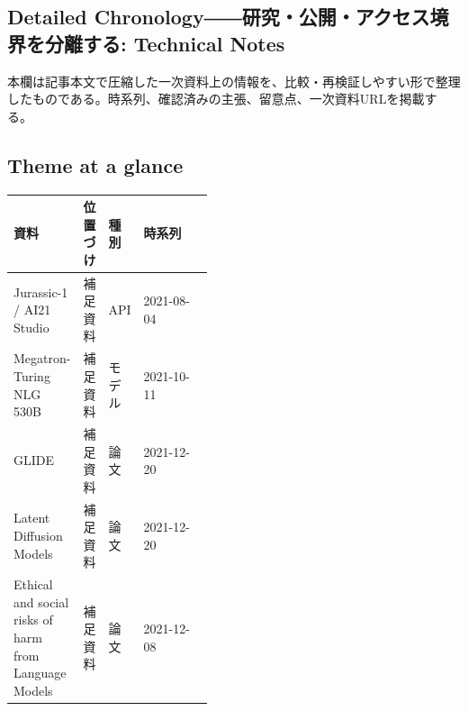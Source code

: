 \subsection*{Detailed Chronology――研究・公開・アクセス境界を分離する: Technical Notes}
本欄は記事本文で圧縮した一次資料上の情報を、比較・再検証しやすい形で整理したものである。時系列、確認済みの主張、留意点、一次資料URLを掲載する。
\smallskip
{}\par
\medskip
\subsection*{Theme at a glance}
\begin{center}
\footnotesize
\begin{tabularx}{\linewidth}{@{}p{0.20\linewidth}p{0.10\linewidth}p{0.14\linewidth}X@{}}
\toprule
資料 & 位置づけ & 種別 & 時系列 \\
\midrule
Jurassic-1 / AI21 Studio & 補足資料 & API & 2021-08-04 \\
Megatron-Turing NLG 530B & 補足資料 & モデル & 2021-10-11 \\
GLIDE & 補足資料 & 論文 & 2021-12-20 \\
Latent Diffusion Models & 補足資料 & 論文 & 2021-12-20 \\
Ethical and social risks of harm from Language Models & 補足資料 & 論文 & 2021-12-08 \\
\bottomrule
\end{tabularx}
\end{center}
\normalsize

